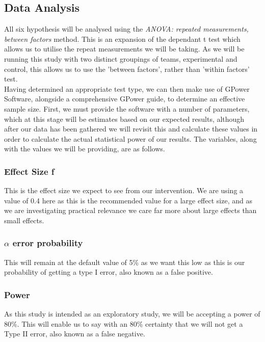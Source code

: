 \documentclass[journal]{IEEEtran}
\begin{document}
\subsection{Data Analysis}
All six hypothesis will be analysed using the \textit{ANOVA: repeated measurements, between factors} method. This is an expansion of the dependant t test\cite{carvadiaANOVA} which allows us to utilise the repeat measurements we will be taking. As we will be running this study with two distinct groupings of teams, experimental and control, this allows us to use the 'between factors', rather than 'within factors' test\cite{carvadiaANOVA}. \\
Having determined an appropriate test type, we can then make use of GPower Software\cite{faul2007g,faul2009statistical}, alongside a comprehensive GPower guide\cite{gpowerguide}, to determine an effective sample size. First, we must provide the software with a number of parameters, which at this stage will be estimates based on our expected results, although after our data has been gathered we will revisit this and calculate these values in order to calculate the actual statistical power of our results. The variables, along with the values we will be providing, are as follows.\\

\subsubsection*{Effect Size f}
This is the effect size we expect to see from our intervention. We are using a value of 0.4 here as this is the recommended value for a large effect size\cite{cohen1992power}, and as we are investigating practical relevance we care far more about large effects than small effects.\\

\subsubsection*{$\alpha$ error probability}
This will remain at the default value of 5\% as we want this low as this is our probability of getting a type I error, also known as a false positive\cite{errortype}.\\

\subsubsection*{Power}
As this study is intended as an exploratory study, we will be accepting a power of 80\%. This will enable us to say with an 80\% certainty that we will not get a Type II error, also known as a false negative\cite{errortype}.\\
\end{document}
